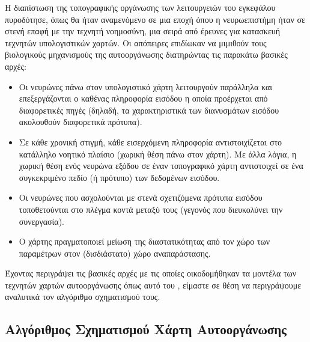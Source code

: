Η διαπίστωση της τοπογραφικής οργάνωσης των λειτουργειών του εγκεφάλου πυροδότησε, όπως θα ήταν αναμενόμενο σε μια εποχή όπου η νευρωεπιστήμη ήταν σε στενή επαφή με την τεχνητή νοημοσύνη, μια σειρά από έρευνες για κατασκευή τεχνητών υπολογιστικών χαρτών. Οι απόπειρες επιδίωκαν να μιμιθούν τους βιολογικούς μηχανισμούς της αυτο\textendash οργάνωσης διατηρώντας τις παρακάτω βασικές αρχές:
\begin{itemize}
  \item Οι νευρώνες πάνω στον υπολογιστικό χάρτη λειτουργούν παράλληλα και επεξεργάζονται ο καθένας πληροφορία εισόδου η οποία προέρχεται από διαφορετικές πηγές (δηλαδή, τα χαρακτηριστικά των διανυσμάτων εισόδου ακολουθούν διαφορετικά πρότυπα).
  \item Σε κάθε χρονική στιγμή, κάθε εισερχόμενη πληροφορία αντιστοιχίζεται στο κατάλληλο νοητικό πλαίσιο (χωρική θέση πάνω στον χάρτη). Με άλλα λόγια, η χωρική θέση ενός νευρώνα εξόδου σε έναν τοπογραφικό χάρτη αντιστοιχεί σε ένα συγκεκριμένο πεδίο (ή πρότυπο) των δεδομένων εισόδου\cite{kohonen1990self}.
  \item Οι νευρώνες που ασχολούνται με στενά σχετιζόμενα πρότυπα εισόδου τοποθετούνται στο πλέγμα κοντά μεταξύ τους (γεγονός που διευκολύνει την συνεργασία).
  \item Ο χάρτης πραγματοποιεί μείωση της διαστατικότητας από τον χώρο των παραμέτρων στον (δισδιάστατο) χώρο αναπαράστασης.\cite{haykin2009neural, knudsen1987computational, durbin1990dimension}
\end{itemize} 
Έχοντας περιγράψει τις βασικές αρχές με τις οποίες οικοδομήθηκαν τα μοντέλα των τεχνητών χαρτών αυτο\textendash οργάνωσης όπως αυτό του , είμαστε σε θέση να περιγράψουμε αναλυτικά τον αλγόριθμο σχηματισμού τους.

\subsection{Αλγόριθμος Σχηματισμού Χάρτη Αυτο\textendash οργάνωσης}

